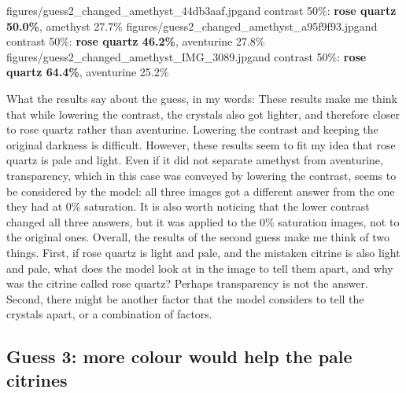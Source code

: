 \documentclass[11pt]{article}
\begin{document}
           {figures/guess2_changed_amethyst_44db3aaf.jpg}{and contrast 50\%: \textbf{rose quartz 50.0\%}, amethyst 27.7\%}
           {figures/guess2_changed_amethyst_a95f9f93.jpg}{and contrast 50\%: \textbf{rose quartz 46.2\%}, aventurine 27.8\%}
           {figures/guess2_changed_amethyst_IMG_3089.jpg}{and contrast 50\%: \textbf{rose quartz 64.4\%}, aventurine 25.2\%}

What the results say about the guess, in my words: These results make me think
that while lowering the contrast, the crystals also got lighter, and therefore
closer to rose quartz rather than aventurine. Lowering the contrast and keeping
the original darkness is difficult. However, these results seem to fit my idea
that rose quartz is pale and light. Even if it did not separate amethyst from
aventurine, transparency, which in this case was conveyed by lowering the
contrast, seems to be considered by the model: all three images got a different
answer from the one they had at 0\% saturation. It is also worth noticing that
the lower contrast changed all three answers, but it was applied to the 0\%
saturation images, not to the original ones. Overall, the results of the second
guess make me think of two things. First, if rose quartz is light and pale, and
the mistaken citrine is also light and pale, what does the model look at in the
image to tell them apart, and why was the citrine called rose quartz? Perhaps
transparency is not the answer. Second, there might be another factor that the
model considers to tell the crystals apart, or a combination of factors.

\subsection*{Guess 3: more colour would help the pale citrines}
\end{document}
